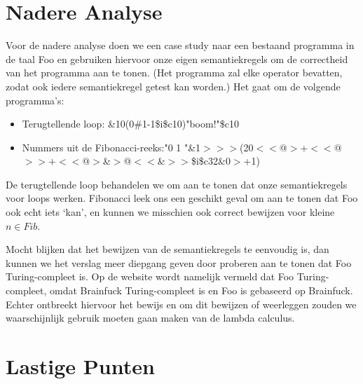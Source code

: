 \documentclass[11pt]{article}
\begin{document}
\section{Nadere Analyse}

Voor de nadere analyse doen we een case study naar een bestaand programma in de taal Foo en gebruiken hiervoor onze eigen semantiekregels om de correctheid van het programma aan te tonen. (Het programma zal elke operator bevatten, zodat ook iedere semantiekregel getest kan worden.) Het gaat om de volgende programma's:

\begin{itemize}
\item Terugtellende loop: \&10(0\#1-1\$i\$c10)"boom!"\$c10
\item Nummers uit de Fibonacci-reeks:\newline "0 1 "\&1\(>>>\)(20\(<<\)@\(>\)+\(<<\)@\(>>+<<\)@\(>\)\&\(>\)@\(<<\)\&\(>>\)\$i\$c32\&0\(>\)+1)
\end{itemize}


De terugtellende loop behandelen we om aan te tonen dat onze semantiekregels voor loops werken.
Fibonacci leek ons een geschikt geval om aan te tonen dat Foo ook echt iets `kan', en kunnen we misschien ook correct bewijzen voor kleine \(n \in Fib\).

Mocht blijken dat het bewijzen van de semantiekregels te eenvoudig is, dan kunnen we het verslag meer diepgang geven door proberen aan te tonen dat Foo Turing-compleet is.
Op de website wordt namelijk vermeld dat Foo Turing-compleet, omdat Brainfuck Turing-compleet is en Foo is gebaseerd op Brainfuck. Echter ontbreekt hiervoor het bewijs en om dit bewijzen of weerleggen zouden we waarschijnlijk gebruik moeten gaan maken van de lambda calculus.


\section{Lastige Punten}
\end{document}
